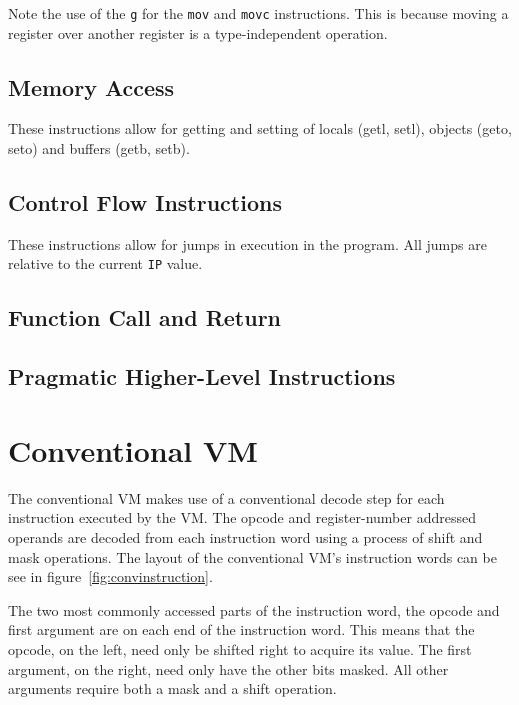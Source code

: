 \documentclass[english,a4paper]{report}
\begin{document}
Note the use of the \verb|g| for the \verb|mov| and \verb|movc| instructions. This is because moving a register over another register is a type-independent operation. 

\subsection{Memory Access}
These instructions allow for getting and setting of locals (getl,
setl), objects (geto, seto) and buffers (getb, setb).


\subsection{Control Flow Instructions}

These instructions allow for jumps in execution in the program. All
jumps are relative to the current \verb|IP| value.



\subsection{Function Call and Return}


\subsection{Pragmatic Higher-Level Instructions}

\section{Conventional VM}

The conventional VM makes use of a conventional decode step for each
instruction executed by the VM. The opcode and register-number
addressed operands are decoded from each instruction word using a
process of shift and mask operations. The layout of the conventional
VM's instruction words can be see in figure~\ref{fig:convinstruction}.

The two most commonly accessed parts of the instruction word, the
opcode and first argument are on each end of the instruction
word. This means that the opcode, on the left, need only be shifted
right to acquire its value. The first argument, on the right, need
only have the other bits masked. All other arguments require both a
mask and a shift operation.
\end{document}
